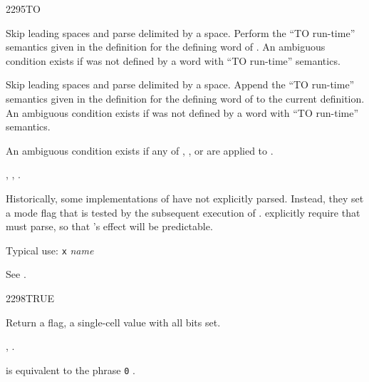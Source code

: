 \begin{worddef}{2295}{TO}
\interpret

	Skip leading spaces and parse  delimited by a space.
	Perform the ``TO  run-time'' semantics given in the
	definition for the defining word of .
	An ambiguous condition exists if  was not defined
	by a word with ``TO  run-time'' semantics.

\compile

	Skip leading spaces and parse  delimited by a
	space. Append the ``TO  run-time'' semantics given
	in the definition for the defining word	of  to the
	current definition.
	An ambiguous condition exists if  was not defined
	by a word with ``TO  run-time'' semantics.

\runtime
	\stack{}{}

\note
	An ambiguous condition exists if any of	,
	\word{[COMPILE]},  or \word{[']} are applied to
	.

\see {},
	 ,
	 .

	\begin{rationale} %
		Historically, some implementations of  have not
		explicitly parsed. Instead, they set a mode flag that is
		tested by the subsequent execution of .
		explicitly require that  must parse, so that
		's effect will be predictable.

		Typical use: \texttt{x}  \emph{name}
	\end{rationale}

	\begin{testing} %
		See .
	\end{testing}
\end{worddef}


\begin{worddef}{2298}{TRUE}
\item {}

	Return a  flag, a single-cell value with all
	bits set.

\see {},
	.

	\begin{rationale} %
		 is equivalent to the phrase
		\texttt{0} .
	\end{rationale}

	\begin{testing}
	 \\
	 \\
	\end{testing}
\end{worddef}


